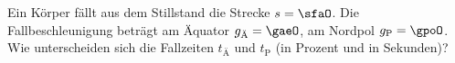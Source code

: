 Ein Körper fällt aus dem Stillstand die Strecke $s = \sfaO$. Die Fallbeschleunigung beträgt am Äquator $g_\text{Ä} = \gaeO$, am Nordpol $g_\text{P} = \gpoO$. Wie unterscheiden sich die Fallzeiten $t_\text{Ä}$ und $t_\text{P}$ (in Prozent und in Sekunden)?
